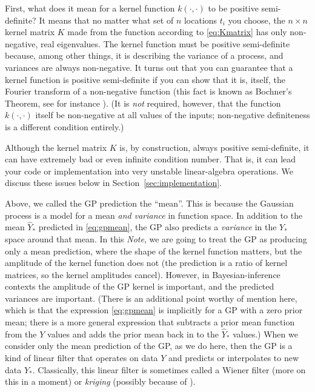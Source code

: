 \documentclass[12pt,letterpaper]{article}
\newcommand{\documentname}{\textsl{Note}}
\newcommand{\sectionname}{Section}
\begin{document}
First, what does it mean for a kernel function $k(\cdot,\cdot)$ to be positive semi-definite?
It means that no matter what set of $n$ locations $t_i$ you choose, the $n\times n$ kernel matrix $K$ made from the function according to \eqref{eq:Kmatrix} has only non-negative, real eigenvalues.
The kernel function must be positive semi-definite because, among other things, it is describing the variance of a process, and variances are always non-negative.
It turns out that you can guarantee that a kernel function is positive semi-definite if you can show that it is, itself, the Fourier transform of a non-negative function (this fact is known as Bochner's Theorem, see for instance \citealt{folland2016course}).
(It is \emph{not} required, however, that the function $k(\cdot,\cdot)$ itself be non-negative at all values of the inputs; non-negative definiteness is a different condition entirely.)

Although the kernel matrix $K$ is, by construction, always positive semi-definite, it can have extremely bad or even infinite condition number. That is, it can lead your code or implementation into very unstable linear-algebra operations. We discuss these issues below in \sectionname~\ref{sec:implementation}.

Above, we called the GP prediction the ``mean''. This is because the Gaussian process is a model for a mean \emph{and variance} in function space.
In addition to the mean $\hat{Y}_\ast$ predicted in \eqref{eq:gpmean}, the GP also predicts a \emph{variance} in the $Y_\ast$ space around that mean.
In this \documentname, we are going to treat the GP as producing only a mean prediction, where the shape of the kernel function matters, but the amplitude of the kernel function does not (the prediction is a ratio of kernel matrices, so the kernel amplitudes cancel).
However, in Bayesian-inference contexts the amplitude of the GP kernel is important, and the predicted variances are important.
(There is an additional point worthy of mention here, which is that the expression \eqref{eq:gpmean} is implicitly for a GP with a zero prior mean; there is a more general expression that subtracts a prior mean function from the $Y$ values and adds the prior mean back in to the $\hat{Y}_\ast$ values.)
When we consider only the mean prediction of the GP, as we do here, then the GP is a kind of linear filter that operates on data $Y$ and predicts or interpolates to new data $Y_\ast$.
Classically, this linear filter is sometimes called a Wiener filter (more on this in a moment) or \emph{kriging} (possibly because of \citealt{krige}).
\end{document}
